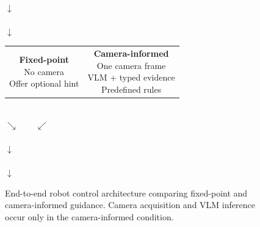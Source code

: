 \documentclass[conference]{IEEEtran}
\begin{document}
\begin{figure}[htbp]
\centering
\small
\setlength{\fboxsep}{5pt}

\\[5pt]
$\downarrow$\\[3pt]

\\[5pt]
$\downarrow$\\[3pt]

\begin{tabular}{@{}cc@{}}
\fbox{\parbox{0.38\linewidth}{\centering
\textbf{Fixed-point}\\
No camera\\
Offer optional hint}}
&
\fbox{\parbox{0.38\linewidth}{\centering
\textbf{Camera-informed}\\
One camera frame\\
VLM + typed evidence\\
Predefined rules}}
\end{tabular}\\[5pt]

$\searrow \qquad \swarrow$\\[3pt]

\\[5pt]
$\downarrow$\\[3pt]

\\[5pt]
$\downarrow$\\[3pt]


\caption{End-to-end robot control architecture comparing fixed-point and camera-informed guidance. Camera acquisition and VLM inference occur only in the camera-informed condition.}
\label{fig:architecture}
\end{figure}
\end{document}
